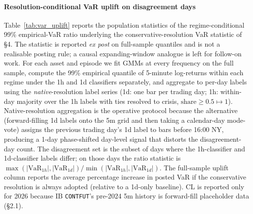 \documentclass[preprint,12pt,authoryear]{elsarticle}
\newcommand{\CL}{CL}
\begin{document}
\paragraph{Resolution-conditional VaR uplift on disagreement days}
Table~\ref{tab:var_uplift} reports the population statistics of the regime-conditional 99\% empirical-VaR ratio underlying the conservative-resolution VaR statistic of \S4. The statistic is reported \emph{ex post} on full-sample quantiles and is not a realisable posting rule; a causal expanding-window analogue is left for follow-on work. For each asset and episode we fit GMMs at every frequency on the full sample, compute the 99\% empirical quantile of 5-minute log-returns within each regime under the 1h and 1d classifiers separately, and aggregate to per-day labels using the \emph{native}-resolution label series (1d: one bar per trading day; 1h: within-day majority over the 1h labels with ties resolved to crisis, $\text{share} \ge 0.5 \mapsto 1$). Native-resolution aggregation is the operative protocol because the alternative (forward-filling 1d labels onto the 5m grid and then taking a calendar-day mode-vote) assigns the previous trading day's 1d label to bars before 16:00 NY, producing a 1-day phase-shifted day-level signal that distorts the disagreement-day count. The disagreement set is the subset of days where the 1h-classifier and 1d-classifier labels differ; on those days the ratio statistic is $\max(|\text{VaR}_{1h}|, |\text{VaR}_{1d}|)/\min(|\text{VaR}_{1h}|, |\text{VaR}_{1d}|)$. The full-sample uplift column reports the average percentage increase in posted VaR if the conservative resolution is always adopted (relative to a 1d-only baseline). \CL{} is reported only for 2026 because IB \texttt{CONTFUT}'s pre-2024 5m history is forward-fill placeholder data (\S{}2.1).
\end{document}
